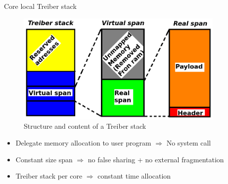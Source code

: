 \documentclass[final]{beamer}
\newlength{\sepwid}
\newlength{\onecolwid}
\newlength{\twocolwid}
\begin{document}
\begin{frame}[t]
\begin{columns}[t]
\begin{column}{\twocolwid}
\begin{columns}[t,totalwidth=\twocolwid]
\begin{column}{\onecolwid} %


\begin{block}{Core local Treiber stack}

\begin{figure}
\includegraphics[width=0.8\linewidth]{charts/treiberStack.png}
\caption{Structure and content of a Treiber stack}
\end{figure}

\begin{itemize}
	\item Delegate memory allocation to user program $\Rightarrow$ No system call
    \item Constant size span $\Rightarrow$ no false sharing + no external fragmentation
    \item Treiber stack per core $\Rightarrow$ constant time allocation
\end{itemize}

\end{block}


\end{column}						%
\end{columns}						%
\end{column}						%
\begin{column}{\sepwid}\end{column}	%
\begin{column}{\onecolwid}			%


\end{column}
\end{columns}
\end{frame}
\end{document}
